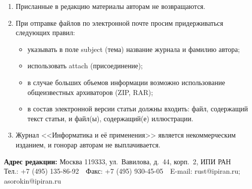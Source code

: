 {{\begin{enumerate}
\item Присланные в редакцию
материалы авторам не возвращаются.
\item При отправке файлов по электронной
почте просим придерживаться следующих правил:
\begin{itemize}
\item указывать в поле subject (тема) название журнала и фамилию автора;
\item использовать attach (присоединение);
\item в случае больших объемов информации возможно
использование общеизвестных архиваторов (ZIP, RAR);
\item в состав электронной версии статьи должны входить: файл, содержащий текст статьи, и файл(ы),
содержащий(е) иллюстрации.
\end{itemize}
\item Журнал <<Информатика и её
применения>> является некоммерческим изданием, и гонорар авторам не
выплачивается.
\end{enumerate}
\textbf{Адрес редакции:} Москва 119333,
ул.~Вавилова, д.~44, корп.~2, ИПИ РАН\\
Тел.: +7 (495) 135-86-92\ \
Факс:  +7 (495) 930-45-05\ \  E-mail:   rust@ipiran.ru; asorokin@ipiran.ru }

}